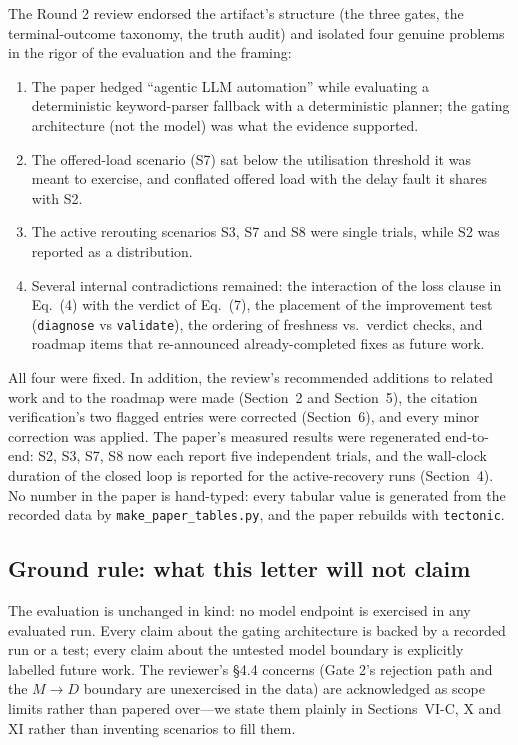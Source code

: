 \documentclass[11pt,a4paper]{article}
\begin{document}
The Round 2 review endorsed the artifact's structure (the three gates, the
terminal-outcome taxonomy, the truth audit) and isolated four genuine
problems in the rigor of the evaluation and the framing:

\begin{enumerate}
  \item The paper hedged ``agentic LLM automation'' while evaluating a
    deterministic keyword-parser fallback with a deterministic planner; the
    gating architecture (not the model) was what the evidence supported.
  \item The offered-load scenario (S7) sat below the utilisation threshold
    it was meant to exercise, and conflated offered load with the delay
    fault it shares with S2.
  \item The active rerouting scenarios S3, S7 and S8 were single trials,
    while S2 was reported as a distribution.
  \item Several internal contradictions remained: the interaction of the
    loss clause in Eq.~(4) with the verdict of Eq.~(7), the placement of
    the improvement test (\texttt{diagnose} vs \texttt{validate}), the
    ordering of freshness vs.\ verdict checks, and roadmap items that
    re-announced already-completed fixes as future work.
\end{enumerate}

\noindent All four were fixed. In addition, the review's recommended
additions to related work and to the roadmap were made (Section~2 and
Section~5), the citation verification's two flagged entries were corrected
(Section~6), and every minor correction was applied. The paper's measured
results were regenerated end-to-end: S2, S3, S7, S8 now each report five
independent trials, and the wall-clock duration of the closed loop is
reported for the active-recovery runs (Section~4). No number in the paper is
hand-typed: every tabular value is generated from the recorded data by
\texttt{make\_paper\_tables.py}, and the paper rebuilds with \texttt{tectonic}.

\subsection{Ground rule: what this letter will not claim}

The evaluation is unchanged in kind: no model endpoint is exercised in any
evaluated run. Every claim about the gating architecture is backed by a
recorded run or a test; every claim about the untested model boundary is
explicitly labelled future work. The reviewer's \S4.4 concerns (Gate 2's
rejection path and the $M \rightarrow D$ boundary are unexercised in the
data) are acknowledged as scope limits rather than papered over---we state
them plainly in Sections~VI-C, X and XI rather than inventing scenarios to
fill them.
\end{document}
